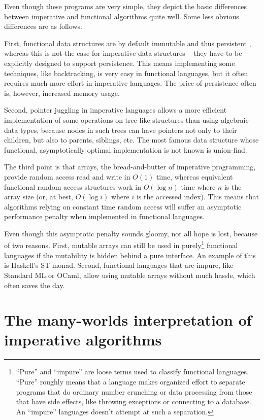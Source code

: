 \documentclass[declaration,mgr,english,shortabstract]{iithesis}
\begin{document}
Even though these programs are very simple, they depict the basic differences between imperative and functional algorithms quite well. Some less obvious differences are as follows.

First, functional data structures are by default immutable and thus persistent \cite{PersistentDataStructures}, whereas this is not the case for imperative data structures -- they have to be explicitly designed to support persistence. This means implementing some techniques, like backtracking, is very easy in functional languages, but it often requires much more effort in imperative languages. The price of persistence often is, however, increased memory usage.

Second, pointer juggling in imperative languages allows a more efficient implementation of some operations on tree-like structures than using algebraic data types, because nodes in such trees can have pointers not only to their children, but also to parents, siblings, etc. The most famous data structure whose functional, asymptotically optimal implementation is not known is union-find. \cite{FunctionalUnionFind}

The third point is that arrays, the bread-and-butter of imperative programming, provide random access read and write in $O(1)$ time, whereas equivalent functional random access structures work in $O(\log n)$ time where $n$ is the array size (or, at best, $O(\log i)$ where $i$ is the accessed index). This means that algorithms relying on constant time random access will suffer an asymptotic performance penalty when implemented in functional languages. \cite{Pippenger}

Even though this asymptotic penalty sounds gloomy, not all hope is lost, because of two reasons. First, mutable arrays can still be used in purely\footnote{``Pure'' and ``impure'' are loose terms used to classify functional languages. ``Pure'' roughly means that a language makes organized effort to separate programs that do ordinary number crunching or data processing from those that have side effects, like throwing exceptions or connecting to a database. An ``impure'' languages doesn't attempt at such a separation.} functional languages if the mutability is hidden behind a pure interface. An example of this is Haskell's ST monad. \cite{STMonad} Second, functional languages that are impure, like Standard ML or OCaml, allow using mutable arrays without much hassle, which often saves the day.

\section{The many-worlds interpretation of imperative algorithms} \label{ch1s3}
\end{document}
